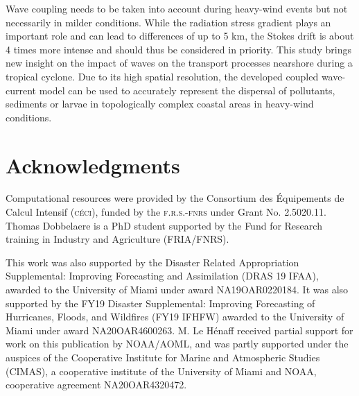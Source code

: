 \documentclass[preprint,12pt,authoryear]{elsarticle}
\begin{document}
Wave coupling needs to be taken into account during heavy-wind events but not necessarily in milder conditions. While the radiation stress gradient plays an important role and can lead to differences of up to 5 km, the Stokes drift is about 4 times more intense and should thus be considered in priority. This study brings new insight on the impact of waves on the transport processes nearshore during a tropical cyclone. Due to its high spatial resolution, the developed coupled wave-current model can be used to accurately represent the dispersal of pollutants, sediments or larvae in topologically complex coastal areas in heavy-wind conditions.  

\section*{Acknowledgments}
Computational resources were provided by the Consortium des \'Equipements de Calcul Intensif (\textsc{c\'eci}), funded by the \textsc{f.r.s.-fnrs} under Grant No. 2.5020.11. Thomas Dobbelaere is a PhD student supported by the Fund for Research training in Industry and Agriculture (\textsc{FRIA}/\textsc{FNRS}).

This work was also supported by the Disaster Related Appropriation Supplemental: Improving Forecasting and Assimilation (DRAS 19 IFAA), awarded to the University of Miami under award NA19OAR0220184. It was also supported by the FY19 Disaster Supplemental: Improving Forecasting of Hurricanes, Floods, and Wildfires (FY19 IFHFW) awarded to the University of Miami under award NA20OAR4600263. M. Le H\'enaff received partial support for work on this publication by NOAA/AOML, and was partly supported under the auspices of the Cooperative Institute for Marine and Atmospheric Studies (CIMAS), a cooperative institute of the University of Miami and NOAA, cooperative agreement NA20OAR4320472.

 

\end{document}
